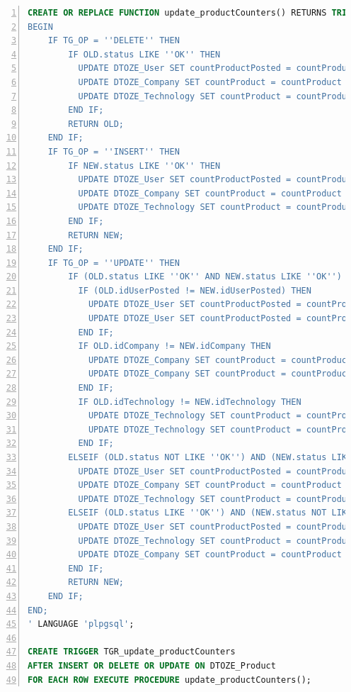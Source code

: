 \documentclass[11pt,a4paper]{article}
\begin{document}
\vspace{0.3cm}
\begin{lstlisting}[language=SQL, label=DescriptiveLabel, backgroundcolor=\color{grey}, numbers=left, basicstyle=\tiny, breaklines=true, breakatwhitespace=true, showspaces=false, showstringspaces=false]
CREATE OR REPLACE FUNCTION update_productCounters() RETURNS TRIGGER AS '
BEGIN
    IF TG_OP = ''DELETE'' THEN
        IF OLD.status LIKE ''OK'' THEN
          UPDATE DTOZE_User SET countProductPosted = countProductPosted - 1 WHERE id = OLD.idUserPosted;
          UPDATE DTOZE_Company SET countProduct = countProduct - 1 WHERE id = OLD.idCompany;
          UPDATE DTOZE_Technology SET countProduct = countProduct - 1 where id = OLD.idTechnology;
        END IF;
        RETURN OLD;
    END IF;
    IF TG_OP = ''INSERT'' THEN
        IF NEW.status LIKE ''OK'' THEN
          UPDATE DTOZE_User SET countProductPosted = countProductPosted + 1 WHERE id = NEW.idUserPosted;
          UPDATE DTOZE_Company SET countProduct = countProduct + 1 WHERE id = NEW.idCompany;
          UPDATE DTOZE_Technology SET countProduct = countProduct + 1 where id = NEW.idTechnology;
        END IF;
        RETURN NEW;
    END IF;
    IF TG_OP = ''UPDATE'' THEN
        IF (OLD.status LIKE ''OK'' AND NEW.status LIKE ''OK'') THEN
          IF (OLD.idUserPosted != NEW.idUserPosted) THEN
            UPDATE DTOZE_User SET countProductPosted = countProductPosted + 1 WHERE id = NEW.idUserPosted;
            UPDATE DTOZE_User SET countProductPosted = countProductPosted - 1 WHERE id = OLD.idUserPosted; 
          END IF;
          IF OLD.idCompany != NEW.idCompany THEN
            UPDATE DTOZE_Company SET countProduct = countProduct + 1 WHERE id = NEW.idCompany;
            UPDATE DTOZE_Company SET countProduct = countProduct - 1 WHERE id = OLD.idCompany;
          END IF;
          IF OLD.idTechnology != NEW.idTechnology THEN
            UPDATE DTOZE_Technology SET countProduct = countProduct + 1 where id = NEW.idTechnology;
            UPDATE DTOZE_Technology SET countProduct = countProduct - 1 where id = OLD.idTechnology;
          END IF;
        ELSEIF (OLD.status NOT LIKE ''OK'') AND (NEW.status LIKE ''OK'') THEN
          UPDATE DTOZE_User SET countProductPosted = countProductPosted + 1 WHERE id = NEW.idUserPosted;
          UPDATE DTOZE_Company SET countProduct = countProduct + 1 WHERE id = NEW.idCompany;
          UPDATE DTOZE_Technology SET countProduct = countProduct + 1 where id = NEW.idTechnology;
        ELSEIF (OLD.status LIKE ''OK'') AND (NEW.status NOT LIKE ''OK'') THEN
          UPDATE DTOZE_User SET countProductPosted = countProductPosted - 1 WHERE id = OLD.idUserPosted;
          UPDATE DTOZE_Technology SET countProduct = countProduct - 1 where id = OLD.idTechnology;
          UPDATE DTOZE_Company SET countProduct = countProduct - 1 WHERE id = OLD.idCompany;
        END IF;
        RETURN NEW;
    END IF;
END;
' LANGUAGE 'plpgsql';

CREATE TRIGGER TGR_update_productCounters
AFTER INSERT OR DELETE OR UPDATE ON DTOZE_Product
FOR EACH ROW EXECUTE PROCEDURE update_productCounters();
\end{lstlisting}
\vspace{0.3cm}
\newpage
\end{document}
